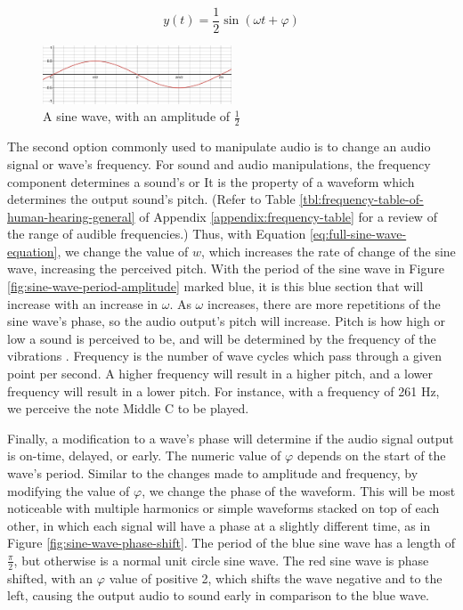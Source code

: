 \begin{equation}\label{eq:half-sized-sine-wave}
	y(t) = \frac{1}{2} \sin(\omega t + \varphi)
\end{equation}

\begin{figure}[ht]
	\centering
	\includegraphics[width=0.5\textwidth]{figures/half-sized-sine-wave.png}
	\caption{A sine wave, with an amplitude of $\frac{1}{2}$}
	\label{fig:half-sized-sine-wave}
\end{figure}

The second option commonly used to manipulate audio is to change an audio signal or wave's frequency. For sound and audio manipulations, the frequency component determines a sound's  or  It is the property of a waveform which determines the output sound's pitch. (Refer to Table \ref{tbl:frequency-table-of-human-hearing-general} of Appendix \ref{appendix:frequency-table} for a review of the range of audible frequencies.) Thus, with Equation \ref{eq:full-sine-wave-equation}, we change the value of $w$, which increases the rate of change of the sine wave, increasing the perceived pitch. With the period of the sine wave in Figure \ref{fig:sine-wave-period-amplitude} marked blue, it is this blue section that will increase with an increase in $\omega$. As $\omega$ increases, there are more repetitions of the sine wave's phase, so the audio output's pitch will increase. Pitch is how high or low a sound is perceived to be, and will be determined by the frequency of the vibrations \cite{Toft_2020}. Frequency is the number of wave cycles which pass through a given point per second. A higher frequency will result in a higher pitch, and a lower frequency will result in a lower pitch. For instance, with a frequency of 261 Hz, we perceive the note Middle C to be played. 

Finally, a modification to a wave's phase will determine if the audio signal output is on-time, delayed, or early. The numeric value of $\varphi$ depends on the start of the wave's period. Similar to the changes made to amplitude and frequency, by modifying the value of $\varphi$, we change the phase of the waveform. This will be most noticeable with multiple harmonics or simple waveforms stacked on top of each other, in which each signal will have a phase at a slightly different time, as in Figure \ref{fig:sine-wave-phase-shift}. The period of the blue sine wave has a length of $\frac{\pi}{2}$, but otherwise is a normal unit circle sine wave. The red sine wave is phase shifted, with an $\varphi$ value of positive 2, which shifts the wave negative and to the left, causing the output audio to sound early in comparison to the blue wave. 


